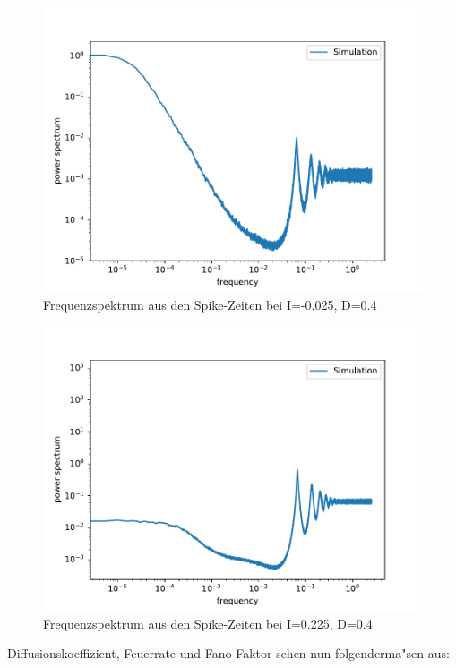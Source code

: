 \documentclass[12pt,a4paper]{article}
\begin{document}
\begin{figure}[H]
	\centering
	\includegraphics[scale=0.9]{inapikrealfast3jjem3407delta.pdf}
	\caption{Frequenzspektrum aus den Spike-Zeiten bei I=-0.025, D=0.4}
	\label{sp407delta}
\end{figure}
\begin{figure}[H]
	\centering
	\includegraphics[scale=0.9]{inapikrealfast3jjem34017delta.pdf}
	\caption{Frequenzspektrum aus den Spike-Zeiten bei I=0.225, D=0.4}
	\label{sp4017delta}
\end{figure}
Diffusionskoeffizient, Feuerrate und Fano-Faktor sehen nun folgenderma"sen aus:
\end{document}
